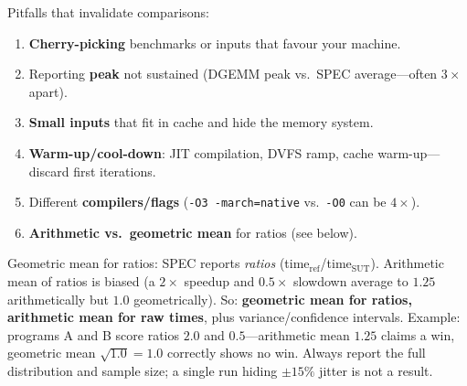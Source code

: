 \begin{center}
\end{center}

Pitfalls that invalidate comparisons:
\begin{enumerate}[leftmargin=1.4em]
\item \textbf{Cherry-picking} benchmarks or inputs that favour your machine.
\item Reporting \textbf{peak} not sustained (DGEMM peak vs.\ SPEC average---often $3\times$ apart).
\item \textbf{Small inputs} that fit in cache and hide the memory system.
\item \textbf{Warm-up/cool-down}: JIT compilation, DVFS ramp, cache warm-up---discard first iterations.
\item Different \textbf{compilers/flags} (\texttt{-O3 -march=native} vs.\ \texttt{-O0} can be $4\times$).
\item \textbf{Arithmetic vs.\ geometric mean} for ratios (see below).
\end{enumerate}

Geometric mean for ratios: SPEC reports \emph{ratios} (time$_{\text{ref}}$/time$_{\text{SUT}}$). Arithmetic mean of ratios is biased (a $2\times$ speedup and $0.5\times$ slowdown average to $1.25$ arithmetically but $1.0$ geometrically). So: \textbf{geometric mean for ratios, arithmetic mean for raw times}, plus variance/confidence intervals. Example: programs A and B score ratios $2.0$ and $0.5$---arithmetic mean $1.25$ claims a win, geometric mean $\sqrt{1.0}=1.0$ correctly shows no win. Always report the full distribution and sample size; a single run hiding $\pm15\%$ jitter is not a result.

